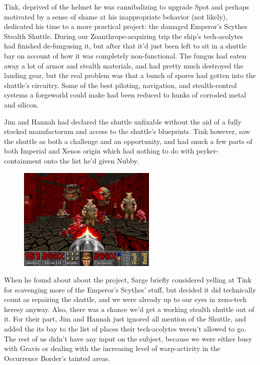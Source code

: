 Tink, deprived of the helmet he was cannibalizing to upgrade Spot and perhaps motivated by a sense of shame at his inappropriate behavior (not likely), dedicated his time to a more practical project: 
the damaged Emperor's Scythes Stealth Shuttle. 
During our Zoanthrope-acquiring trip the ship's tech-acolytes had finished de-fungusing it, but after that it'd just been left to sit in a shuttle bay on account of how it was completely non-functional. 
The fungus had eaten away a lot of armor and stealth materials, and had pretty much destroyed the landing gear, but the real problem was that a bunch of spores had gotten into the shuttle's circuitry. 
Some of the best piloting, navigation, and stealth-control systems a forgeworld could make had been reduced to hunks of corroded metal and silicon. 


Jim and Hannah had declared the shuttle unfixable without the aid of a fully stocked manufactorum and access to the shuttle's blueprints. 
Tink however, saw the shuttle as both a challenge and an opportunity, and had snuck a few parts of both Imperial and Xenos origin which had nothing to do with psyker-containment onto the list he'd given Nubby.

\begin{figure}
	\begin{center}
		\includegraphics[width=\figwidth]{pics/15/10.png}
	\end{center}
\end{figure}
When he found about about the project, Sarge briefly considered yelling at Tink for scavenging more of the Emperor's Scythes' stuff, but decided it did technically count as repairing the shuttle, and we were already up to our eyes in xeno-tech heresy anyway. 
Also, there was a chance we'd get a working stealth shuttle out of it. 
For their part, Jim and Hannah just ignored all mention of the Shuttle, and added the its bay to the list of places their tech-acolytes weren't allowed to go. 
The rest of us didn't have any input on the subject, because we were either busy with Gravis or dealing with the increasing level of warp-activity in the Occurrence Border's tainted areas.

